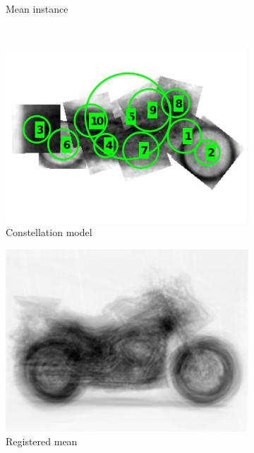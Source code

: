 \begin{figure}[ht]
\begin{subfigure}[b]{0.28\linewidth}
	\caption{Mean instance}
	\label{fig:concept2}
\end{subfigure} \\ 
\begin{subfigure}[b]{0.28\linewidth} \centering
	\includegraphics[width=\linewidth]{fig/3dreg/pictorial2.pdf}
	\caption{Constellation model}
	\label{fig:concept4}
\end{subfigure}
\begin{subfigure}[b]{0.28\linewidth} \centering 
	\label{fig:concept3}
	\includegraphics[width=\linewidth]{fig/3dreg/avgbike_after.png}
	\caption{Registered mean}
\end{subfigure}
\begin{subfigure}[b]{0.28\linewidth} \centering 
	\label{fig:concept5}

\end{subfigure}
\end{figure}

